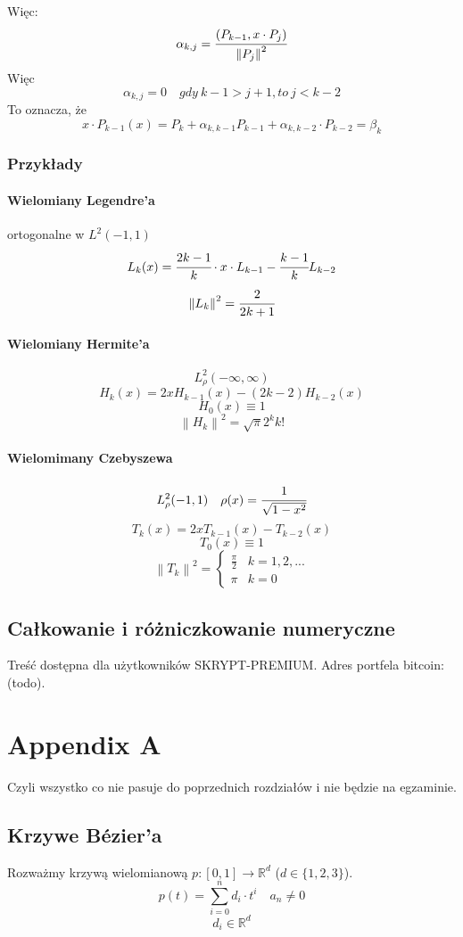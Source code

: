 \documentclass[hidelinks,a4paper,fleqn,oneside]{book}
\newcommand{\RR}{\mathbb{R}}
\newcommand{\ra}{\rightarrow}
\newcommand{\norm}[1]{\left\lVert#1\right\rVert}
\begin{document}
Więc:
\[
	\alpha_{k, j} = \cfrac{(P_{k-1}, x \cdot P_j)}{\norm{P_j}^2}
\]
Więc
\[
	\alpha_{k, j} = 0 \quad gdy\ k-1 >j+1, to\ j < k-2
\]
To oznacza, że
\[
	x \cdot P_{k-1}(x) = P_k + \alpha_{k, k-1} P_{k-1} + \alpha_{k, k-2} \cdot P_{k-2} = \beta_k
\]

\subsection{Przykłady}

\subsubsection{Wielomiany Legendre'a}

ortogonalne w $L^2(-1, 1)$
\[
	L_k(x) = \cfrac{2k-1}{k} \cdot x \cdot L_{k-1} - \cfrac{k-1}{k}L_{k-2}
\]
\[
	\norm{L_k}^2 = \cfrac{2}{2k+1}
\]

\subsubsection{Wielomiany Hermite'a}
\[
L_\rho^2(-\infty, \infty)
\]
\[
H_k(x) = 2xH_{k-1}(x) - (2k - 2)H_{k-2}(x)
\]
\[
	H_0(x) \equiv 1
\]
\[
	\norm{H_k}^2 = \sqrt{\pi} 2^k k!
\]
\subsubsection{Wielomimany Czebyszewa}
\[
	L_\rho^2(-1, 1) \quad \rho(x) = \cfrac{1}{\sqrt{1-x^2}}
\]
\[
	T_k(x) = 2xT_{k-1}(x) - T_{k-2}(x)
\]
\[
	T_0(x) \equiv 1
\]
\[
	\norm{T_k}^2 = \left\{ \begin{array}{rl} \frac{\pi}{2} & k = 1, 2, ... \\ \pi & k = 0\end{array}\right.
\]

\section{Całkowanie i różniczkowanie numeryczne}

Treść dostępna dla użytkowników SKRYPT-PREMIUM. Adres portfela bitcoin: (todo).

\chapter{Appendix A}
Czyli wszystko co nie pasuje do poprzednich rozdziałów i nie będzie na egzaminie.
\section{Krzywe Bézier'a}
	Rozważmy krzywą wielomianową $p: [0, 1] \ra \RR^d$ ($d \in \{1, 2, 3\}$).
	\[
		p(t) = \sum_{i=0}^n d_i \cdot t^i \quad a_n \neq 0
	\]
	\[
		d_i \in \RR^d
	\]
\end{document}
